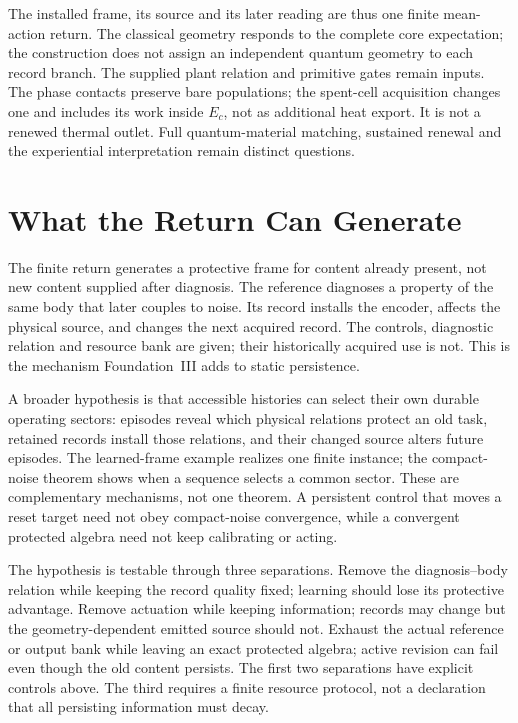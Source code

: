\documentclass[12pt]{article}
\theoremstyle{definition}
\theoremstyle{remark}
\begin{document}
The installed frame, its source and its later reading are thus one
finite mean-action return. The classical geometry responds to the
complete core expectation; the construction does not assign an
independent quantum geometry to each record branch.
The supplied plant relation and primitive
gates remain inputs. The phase contacts preserve bare populations;
the spent-cell acquisition changes one and includes its work inside
$E_c$, not as additional heat export. It is not a renewed thermal
outlet. Full quantum-material matching, sustained renewal and the
experiential interpretation remain distinct questions.

\section{What the Return Can Generate}\label{sec:open}

The finite return generates a protective frame for content already
present, not new content supplied after diagnosis. The reference
diagnoses a property of the same body that later couples to noise.
Its record installs the encoder, affects the physical source, and
changes the next acquired record. The controls, diagnostic relation
and resource bank are given; their historically acquired use is not.
This is the mechanism Foundation~III adds to static persistence.

A broader hypothesis is that accessible histories can select their
own durable operating sectors: episodes reveal which physical
relations protect an old task, retained records install those
relations, and their changed source alters future episodes. The
learned-frame example realizes one finite instance; the compact-noise
theorem shows when a sequence selects a common sector. These are
complementary mechanisms, not one theorem. A persistent control that
moves a reset target need not obey compact-noise convergence, while
a convergent protected algebra need not keep calibrating or acting.

The hypothesis is testable through three separations. Remove the
diagnosis--body relation while keeping the record quality fixed;
learning should lose its protective advantage. Remove actuation
while keeping information; records may change but the
geometry-dependent emitted source should not. Exhaust the actual
reference or output bank while leaving an exact protected algebra;
active revision can fail even though the old content persists.
The first two separations have explicit controls above. The third
requires a finite resource protocol, not a declaration that all
persisting information must decay.
\end{document}

